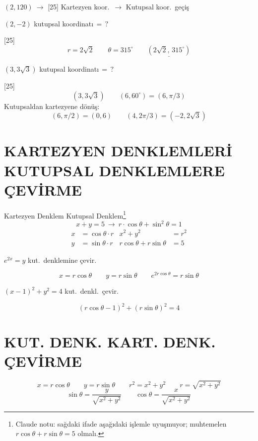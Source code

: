 \documentclass[11pt,a4paper]{article}
\begin{document}
\noindent$(2,120)\ \longrightarrow$
[25]
\noindent Kartezyen koor.\ $\to$ Kutupsal koor.\ geçiş

\begin{ornek}
$(2,-2)$ kutupsal koordinatı$\,=\,?$
\end{ornek}
[25]
\[ r=2\sqrt2\qquad \theta=315^\circ\qquad \underline{(2\sqrt2,\,315^\circ)} \]
\begin{ornek}
$(3,3\sqrt3)$ kutupsal koordinatı$\,=\,?$
\end{ornek}
[25]
\[ (3,3\sqrt3)\qquad (6,60^\circ)=(6,\pi/3) \]
\noindent Kutupsaldan kartezyene dönüş:
\[ (6,\pi/2)=(0,6)\qquad (4,2\pi/3)=(-2,2\sqrt3) \]

\section{KARTEZYEN DENKLEMLERİ KUTUPSAL DENKLEMLERE ÇEVİRME}
\noindent Kartezyen Denklem \hfill Kutupsal Denklem\footnote{Claude notu: sağdaki ifade aşağıdaki işlemle uyuşmuyor; muhtemelen $r\cos\theta+r\sin\theta=5$ olmalı.}
\[ x+y=5\ \longrightarrow\ r\cdot\cos\theta+\sin^2\theta=1 \]
\begin{align*}
x&=\cos\theta\cdot r & x^2+y^2&=r^2\\
y&=\sin\theta\cdot r & r\cos\theta+r\sin\theta&=5
\end{align*}
\begin{ornek}
$e^{2x}=y$ kut.\ denklemine çevir.
\end{ornek}
\[ x=r\cos\theta\qquad y=r\sin\theta\qquad e^{2r\cos\theta}=r\sin\theta \]
\begin{ornek}
$(x-1)^2+y^2=4$ kut.\ denkl.\ çevir.
\end{ornek}
\[ (r\cos\theta-1)^2+(r\sin\theta)^2=4 \]

\section{KUT. DENK. KART. DENK. ÇEVİRME}
\[ x=r\cos\theta\qquad y=r\sin\theta\qquad r^2=x^2+y^2\qquad r=\sqrt{x^2+y^2} \]
\[ \sin\theta=\frac{y}{\sqrt{x^2+y^2}}\qquad \cos\theta=\frac{x}{\sqrt{x^2+y^2}} \]
\end{document}
